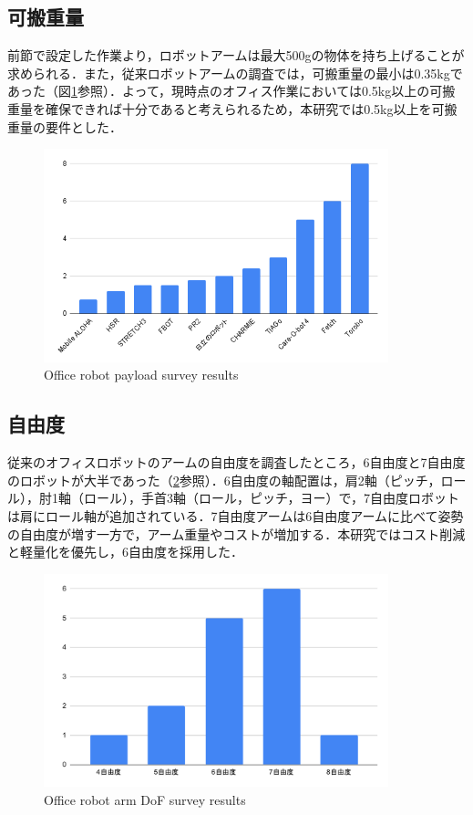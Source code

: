 \subsection{可搬重量}
前節で設定した作業より，ロボットアームは最大500gの物体を持ち上げることが求められる．また，従来ロボットアームの調査では，可搬重量の最小は0.35kgであった（図\ref{fig:payload}参照）．よって，現時点のオフィス作業においては0.5kg以上の可搬重量を確保できれば十分であると考えられるため，本研究では0.5kg以上を可搬重量の要件とした．
\begin{figure}
  \centering
  \includegraphics[width=10cm]{images/2syou/payload.png}
  \caption{Office robot payload survey results}
  \label{fig:payload}
\end{figure}
\clearpage

\subsection{自由度}
従来のオフィスロボットのアームの自由度を調査したところ，6自由度と7自由度のロボットが大半であった（\ref{fig:armDof}参照）．6自由度の軸配置は，肩2軸（ピッチ，ロール），肘1軸（ロール），手首3軸（ロール，ピッチ，ヨー）で，7自由度ロボットは肩にロール軸が追加されている．7自由度アームは6自由度アームに比べて姿勢の自由度が増す一方で，アーム重量やコストが増加する．本研究ではコスト削減と軽量化を優先し，6自由度を採用した．
\begin{figure}[h]
  \centering
  \includegraphics[width=10cm]{images/2syou/armDof.pdf}
  \caption{Office robot arm DoF survey results}
  \label{fig:armDof}
\end{figure}
\clearpage

